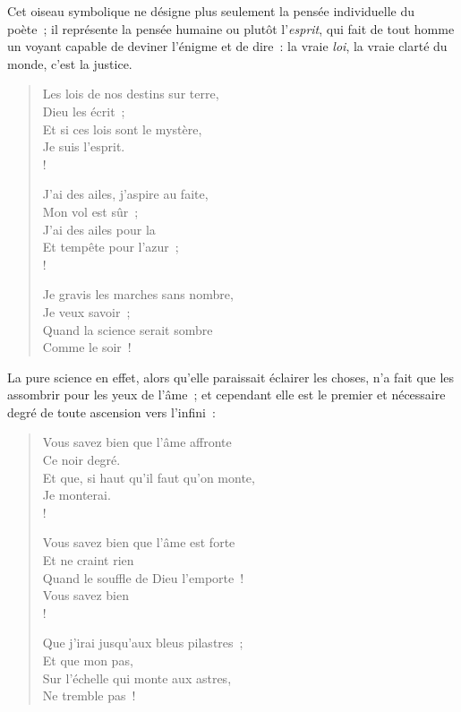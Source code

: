\documentclass[french,twoside]{book} %
\begin{document}
\noindent Cet oiseau symbolique ne désigne plus seulement la pensée individuelle du poète ; il représente la pensée humaine ou plutôt l’\emph{esprit}, qui fait de tout homme un voyant capable de deviner l’énigme et de dire : la vraie \emph{loi}, la vraie clarté du monde, c’est la justice.\par


\begin{verse}
Les lois de nos destins sur terre,\\
Dieu les écrit ;\\
Et si ces lois sont le mystère,\\
Je suis l’esprit.\\!

J’ai des ailes, j’aspire au faite,\\
Mon vol est sûr ;\\
J’ai des ailes pour la\\
Et tempête pour l’azur ;\\!

Je gravis les marches sans nombre,\\
Je veux savoir ;\\
Quand la science serait sombre\\
Comme le soir !\\
\end{verse}

\noindent La pure science en effet, alors qu’elle paraissait éclairer les choses, n’a fait que les assombrir pour les yeux de l’âme ; et cependant elle est le premier et nécessaire degré de toute ascension vers l’infini :\par


\begin{verse}
Vous savez bien que l’âme affronte\\
Ce noir degré.\\
Et que, si haut qu’il faut qu’on monte,\\
Je monterai.\\!

Vous savez bien que l’âme est forte\\
Et ne craint rien\\
Quand le souffle de Dieu l’emporte !\\
Vous savez bien\\!

Que j’irai jusqu’aux bleus pilastres ;\\
Et que mon pas,\\
Sur l’échelle qui monte aux astres,\\
Ne tremble pas !\\
\end{verse}
\end{document}
